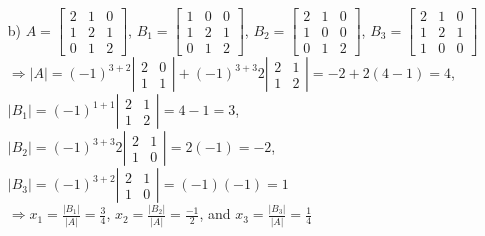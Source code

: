 \documentclass[12pt,pdftex]{article}
\begin{document}
\begin{itemize}
\begin{itemize}
\item[b)] $A=\begin{bmatrix}
		  2 & 1 & 0 \\ 1 & 2 & 1 \\ 0 & 1 & 2
		  \end{bmatrix}$, 
          $B_1=\begin{bmatrix}
          1 & 0 & 0 \\ 1 & 2 & 1 \\ 0 & 1 & 2
          \end{bmatrix}$, 
          $B_2=\begin{bmatrix}
		  2 & 1 & 0 \\ 1 & 0 & 0 \\ 0 & 1 & 2
		  \end{bmatrix}$, 
          $B_3=\begin{bmatrix}
		  2 & 1 & 0 \\ 1 & 2 & 1 \\ 1 & 0 & 0
		  \end{bmatrix}$ \\ $\Rightarrow 
          |A|=(-1)^{3+2}\left|\begin{matrix}
          2 & 0 \\ 1 & 1
          \end{matrix}\right| +
          (-1)^{3+3}2\left|\begin{matrix}
          2 & 1 \\ 1 & 2
          \end{matrix}\right|=-2+2(4-1)=4$, \\ $
          |B_1|=(-1)^{1+1}\left|\begin{matrix}
          2 & 1 \\ 1 & 2
          \end{matrix}\right| = 4 - 1 = 3$, \\ $
          |B_2|=(-1)^{3+3}2\left|\begin{matrix}
          2 & 1 \\ 1 & 0
          \end{matrix}\right|=2(-1)=-2$, \\ $
          |B_3|=(-1)^{3+2}\left|\begin{matrix}
          2 & 1 \\ 1 & 0
          \end{matrix}\right|=(-1)(-1)=1$ \\ $\Rightarrow 
          x_1=\frac{|B_1|}{|A|}=\frac{3}{4}$, $x_2=\frac{|B_2|}{|A|}=\frac{-1}{2}$, and $x_3=\frac{|B_3|}{|A|}=\frac{1}{4}$
\end{itemize}


\end{itemize}
\end{document}

